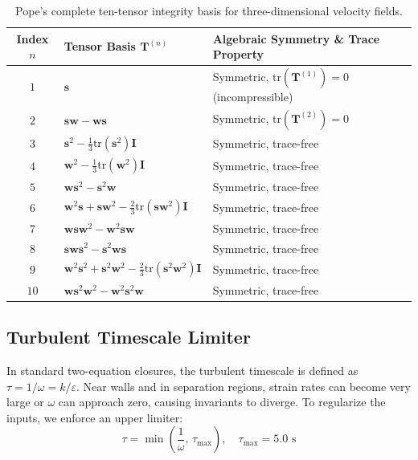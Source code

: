 \documentclass[11pt,a4paper]{article}
\begin{document}
\begin{table}[htbp]
\centering
\caption{Pope's \cite{pope1975more} complete ten-tensor integrity basis for three-dimensional velocity fields.}
\label{tab:pope_bases}
\begin{tabular}{c l l}
\toprule
Index $n$ & Tensor Basis $\mathbf{T}^{(n)}$ & Algebraic Symmetry \& Trace Property \\
\midrule
$1$ & $\mathbf{s}$ & Symmetric, $\mathrm{tr}(\mathbf{T}^{(1)}) = 0$ (incompressible) \\
$2$ & $\mathbf{s}\mathbf{w} - \mathbf{w}\mathbf{s}$ & Symmetric, $\mathrm{tr}(\mathbf{T}^{(2)}) = 0$ \\
$3$ & $\mathbf{s}^2 - \frac{1}{3}\mathrm{tr}(\mathbf{s}^2)\mathbf{I}$ & Symmetric, trace-free \\
$4$ & $\mathbf{w}^2 - \frac{1}{3}\mathrm{tr}(\mathbf{w}^2)\mathbf{I}$ & Symmetric, trace-free \\
$5$ & $\mathbf{w}\mathbf{s}^2 - \mathbf{s}^2\mathbf{w}$ & Symmetric, trace-free \\
$6$ & $\mathbf{w}^2\mathbf{s} + \mathbf{s}\mathbf{w}^2 - \frac{2}{3}\mathrm{tr}(\mathbf{s}\mathbf{w}^2)\mathbf{I}$ & Symmetric, trace-free \\
$7$ & $\mathbf{w}\mathbf{s}\mathbf{w}^2 - \mathbf{w}^2\mathbf{s}\mathbf{w}$ & Symmetric, trace-free \\
$8$ & $\mathbf{s}\mathbf{w}\mathbf{s}^2 - \mathbf{s}^2\mathbf{w}\mathbf{s}$ & Symmetric, trace-free \\
$9$ & $\mathbf{w}^2\mathbf{s}^2 + \mathbf{s}^2\mathbf{w}^2 - \frac{2}{3}\mathrm{tr}(\mathbf{s}^2\mathbf{w}^2)\mathbf{I}$ & Symmetric, trace-free \\
$10$ & $\mathbf{w}\mathbf{s}^2\mathbf{w}^2 - \mathbf{w}^2\mathbf{s}^2\mathbf{w}$ & Symmetric, trace-free \\
\bottomrule
\end{tabular}
\end{table}

\subsection{Turbulent Timescale Limiter}
In standard two-equation closures, the turbulent timescale is defined as $\tau = 1/\omega = k/\varepsilon$. Near walls and in separation regions, strain rates can become very large or $\omega$ can approach zero, causing invariants to diverge. To regularize the inputs, we enforce an upper limiter:
\begin{equation}
\tau = \min\left(\frac{1}{\omega}, \, \tau_{\max}\right), \quad \tau_{\max} = 5.0\text{ s}
\end{equation}
\end{document}
